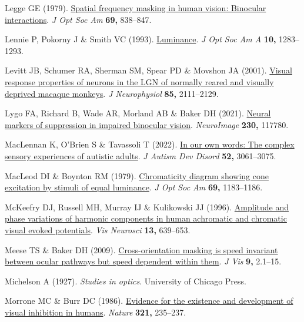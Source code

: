 \documentclass[
  letterpaper,
  DIV=11,
  numbers=noendperiod]{scrartcl}
\newlength{\cslhangindent}
\newenvironment{CSLReferences}[2] %
 {\begin{list}{}{%
  \setlength{\itemindent}{0pt}
  \setlength{\leftmargin}{0pt}
  \setlength{\parsep}{0pt}
  \ifodd #1
   \setlength{\leftmargin}{\cslhangindent}
   \setlength{\itemindent}{-1\cslhangindent}
  \fi
  \setlength{\itemsep}{#2\baselineskip}}}
 {\end{list}}
\begin{document}
\begin{CSLReferences}{1}{1}
Legge GE (1979). \href{https://doi.org/10.1364/josa.69.000838}{Spatial
frequency masking in human vision: Binocular interactions}. \emph{J Opt
Soc Am} \textbf{69,} 838--847.

Lennie P, Pokorny J \& Smith VC (1993).
\href{https://doi.org/10.1364/josaa.10.001283}{Luminance}. \emph{J Opt
Soc Am A} \textbf{10,} 1283--1293.

Levitt JB, Schumer RA, Sherman SM, Spear PD \& Movshon JA (2001).
\href{https://doi.org/10.1152/jn.2001.85.5.2111}{Visual response
properties of neurons in the LGN of normally reared and visually
deprived macaque monkeys}. \emph{J Neurophysiol} \textbf{85,}
2111--2129.

Lygo FA, Richard B, Wade AR, Morland AB \& Baker DH (2021).
\href{https://doi.org/10.1016/j.neuroimage.2021.117780}{Neural markers
of suppression in impaired binocular vision}. \emph{NeuroImage}
\textbf{230,} 117780.

MacLennan K, O'Brien S \& Tavassoli T (2022).
\href{https://doi.org/10.1007/s10803-021-05186-3}{In our own words: The
complex sensory experiences of autistic adults}. \emph{J Autism Dev
Disord} \textbf{52,} 3061--3075.

MacLeod DI \& Boynton RM (1979).
\href{https://doi.org/10.1364/josa.69.001183}{Chromaticity diagram
showing cone excitation by stimuli of equal luminance}. \emph{J Opt Soc
Am} \textbf{69,} 1183--1186.

McKeefry DJ, Russell MH, Murray IJ \& Kulikowski JJ (1996).
\href{https://doi.org/10.1017/s0952523800008543}{Amplitude and phase
variations of harmonic components in human achromatic and chromatic
visual evoked potentials}. \emph{Vis Neurosci} \textbf{13,} 639--653.

Meese TS \& Baker DH (2009).
\href{https://doi.org/10.1167/9.5.2}{Cross-orientation masking is speed
invariant between ocular pathways but speed dependent within them}.
\emph{J Vis} \textbf{9,} 2.1--15.

Michelson A (1927). \emph{Studies in optics}. University of Chicago
Press.

Morrone MC \& Burr DC (1986).
\href{https://doi.org/10.1038/321235a0}{Evidence for the existence and
development of visual inhibition in humans}. \emph{Nature} \textbf{321,}
235--237.


\end{CSLReferences}
\end{document}

